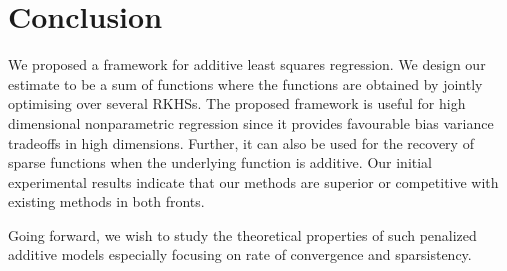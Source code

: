 
\section{Conclusion}
\label{sec:conclusion}

We proposed a framework for additive least squares regression. We design our
estimate to be a sum of functions where the functions are obtained by jointly
optimising over several RKHSs.
The proposed framework is useful for high dimensional nonparametric regression
since it provides favourable bias variance tradeoffs in high dimensions.
Further, it can also be used for the recovery of sparse functions when the
underlying function is additive.
Our initial experimental results indicate that our methods are superior or
competitive with existing methods in both fronts.

Going forward, we wish to study the theoretical properties of such penalized
additive models especially focusing on rate of convergence and sparsistency.

